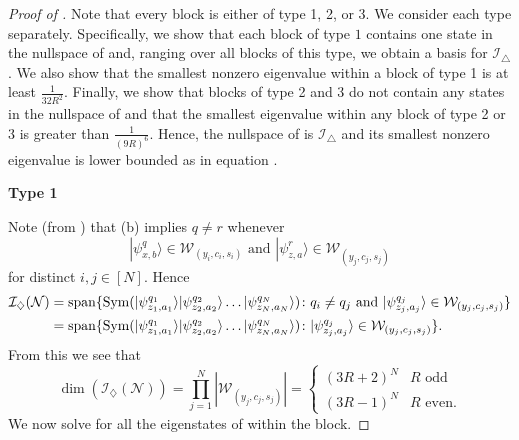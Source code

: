 \documentclass[../thesis-main/thesis-main]{subfiles}
\begin{document}
\begin{proof}[Proof of \protect{}]
Note that every block is either of type 1, 2, or 3. We consider each type separately. Specifically, we show that each block of type $1$ contains one state in the nullspace of  and, ranging over all blocks of this type, we obtain a basis for $\mathcal{I}_{\triangle}$. We also show that the smallest nonzero eigenvalue within a block of type 1 is at least $\frac{1}{32R^{2}}$. Finally, we show that blocks of type 2 and 3 do not contain any states in the nullspace of  and that the smallest eigenvalue within any block of type 2 or 3 is greater than $\frac{1}{(9R)^{6}}$. Hence, the nullspace of  is $\mathcal{I}_{\triangle}$ and its smallest nonzero eigenvalue is lower bounded as in equation .

\medskip

\noindent \textbf{Type 1}

\smallskip

\noindent Note (from ) that (b) implies $q\neq r$ whenever 
\[
|\psi_{x,b}^{q}\rangle\in\mathcal{W}_{(y_{i},c_{i},s_{i})}\text{ and }|\psi_{z,a}^{r}\rangle\in\mathcal{W}_{(y_{j},c_{j},s_{j})}
\]
for distinct $i,j\in[N]$. Hence 
\begin{align*}
\mathcal{\mathcal{I}_{\diamondsuit}}(\mathcal{N}) & =\operatorname{span}\{ \operatorname{Sym}(|\psi_{z_{1},a_{1}}^{q_{1}}\rangle|\psi_{z_{2},a_{2}}^{q_{2}}\rangle\ldots|\psi_{z_{N},a_{N}}^{q_{N}}\rangle)\colon q_{i}\neq q_{j}\text{ and }|\psi_{z_{j},a_{j}}^{q_{j}}\rangle\in\mathcal{W}_{(y_{j},c_{j},s_{j})}\} \\
 & =\operatorname{span}\{ \operatorname{Sym}(|\psi_{z_{1},a_{1}}^{q_{1}}\rangle|\psi_{z_{2},a_{2}}^{q_{2}}\rangle\ldots|\psi_{z_{N},a_{N}}^{q_{N}}\rangle)\colon|\psi_{z_{j},a_{j}}^{q_{j}}\rangle\in\mathcal{W}_{(y_{j},c_{j},s_{j})}\}.
\end{align*}
From this we see that 
\[
\dim(\mathcal{I}_{\diamondsuit}(\mathcal{N}))=\prod_{j=1}^{N}\left|{\mathcal{W}_{(y_{j},c_{j},s_{j})}}\right|=\begin{cases}
\left(3R+2\right)^{N} & R\text{ odd}\\
\left(3R-1\right)^{N} & R\text{ even.}
\end{cases}
\]
We now solve for all the eigenstates of  within the block. 


\end{proof}
\end{document}
